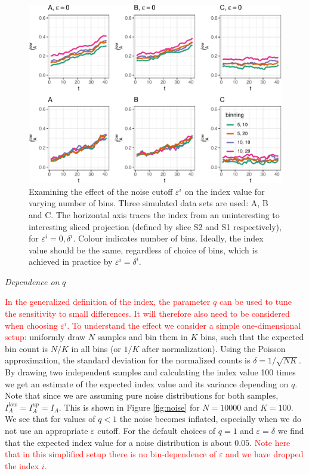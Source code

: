 \documentclass[]{interact}
\theoremstyle{plain}%
\theoremstyle{definition}
\theoremstyle{remark}
\begin{document}
\begin{figure}

{\centering \includegraphics[width=0.9\linewidth]{section_pursuit_files/figure-latex/path_eps-1} 

}

\caption{Examining the effect of the noise cutoff $\varepsilon^i$ on the index value for varying number of bins. Three simulated data sets are used:  A, B and C. The horizontal axis traces the index from an uninteresting to interesting sliced projection (defined by slice S2 and S1 respectively), for $\varepsilon^i=0, \delta^i$. Colour indicates number of bins. Ideally, the index value should be the same, regardless of choice of bins, which is achieved in practice by $\varepsilon^i=\delta^i$.}\label{fig:path_eps}
\end{figure}

\emph{Dependence on} \(q\)

\textcolor{red}{In the generalized definition of the index, the parameter $q$ can be used to tune the sensitivity to small differences. It will therefore also need to be considered when choosing $\varepsilon^i$. To understand the effect we consider a simple one-dimensional setup:}
uniformly draw \(N\) samples and bin them in \(K\) bins, such that the
expected bin count is \(N/K\) in all bins (or \(1/K\) after
normalization). Using the Poisson approximation, the standard deviation
for the normalized counts is \(\delta=1/\sqrt{N K}\). By drawing two
independent samples and calculating the index value 100 times we get an
estimate of the expected index value and its variance depending on
\(q\). Note that since we are assuming pure noise distributions for both
samples, \(I_A^{low}=I_A^{up}=I_A\). This is shown in Figure
\ref{fig:noise} for \(N=10000\) and \(K=100\). We see that for values of
\(q<1\) the noise becomes inflated, especially when we do not use an
appropriate \(\varepsilon\) cutoff. For the default choices of \(q=1\)
and \(\varepsilon=\delta\) we find that the expected index value for a
noise distribution is about \(0.05\).
\textcolor{red}{Note here that in this simplified setup there is no bin-dependence of $\varepsilon$ and we have dropped the index $i$.}
\end{document}
